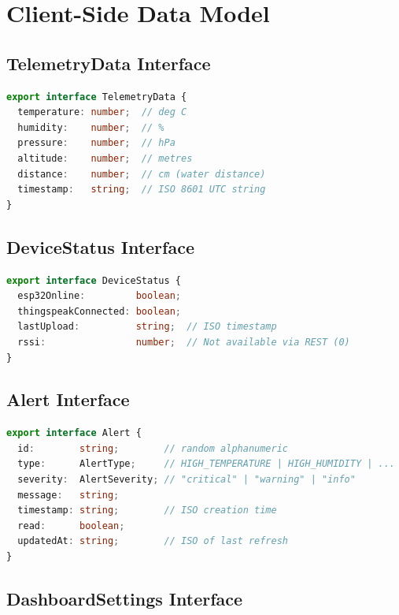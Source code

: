 \section{Client-Side Data Model}

\subsection{TelemetryData Interface}

\begin{lstlisting}[language=TypeScript,caption={TelemetryData interface}]
export interface TelemetryData {
  temperature: number;  // deg C
  humidity:    number;  // %
  pressure:    number;  // hPa
  altitude:    number;  // metres
  distance:    number;  // cm (water distance)
  timestamp:   string;  // ISO 8601 UTC string
}
\end{lstlisting}

\subsection{DeviceStatus Interface}

\begin{lstlisting}[language=TypeScript,caption={DeviceStatus interface}]
export interface DeviceStatus {
  esp32Online:         boolean;
  thingspeakConnected: boolean;
  lastUpload:          string;  // ISO timestamp
  rssi:                number;  // Not available via REST (0)
}
\end{lstlisting}

\subsection{Alert Interface}

\begin{lstlisting}[language=TypeScript,caption={Alert interface}]
export interface Alert {
  id:        string;        // random alphanumeric
  type:      AlertType;     // HIGH_TEMPERATURE | HIGH_HUMIDITY | ...
  severity:  AlertSeverity; // "critical" | "warning" | "info"
  message:   string;
  timestamp: string;        // ISO creation time
  read:      boolean;
  updatedAt: string;        // ISO of last refresh
}
\end{lstlisting}

\subsection{DashboardSettings Interface}

